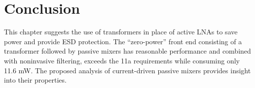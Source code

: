 \section{Conclusion}
This chapter suggests the use of transformers in place of active LNAs to save power and provide ESD protection. The ``zero-power'' front end consisting
of a transformer followed by passive mixers has reasonable performance and combined with noninvasive filtering, exceeds the 11a requirements while
consuming only 11.6 mW.
The proposed analysis of current-driven passive mixers provides insight into their properties.


